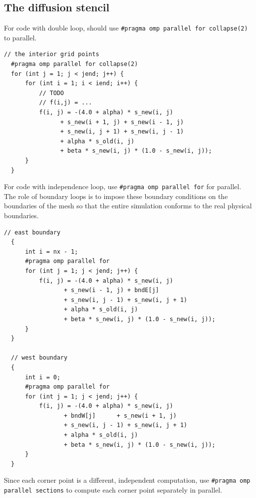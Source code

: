 \documentclass[unicode,11pt,a4paper,oneside,numbers=endperiod,openany]{scrartcl}
\begin{document}
\subsection{The diffusion stencil}
For code with double loop, should use \texttt{\#pragma omp parallel for collapse(2)} to parallel.
\begin{lstlisting}[language=MyC++, style=mystyle, caption={Parallelized Interior Grid Points Calculation with Collapse}]
  // the interior grid points
  #pragma omp parallel for collapse(2)
  for (int j = 1; j < jend; j++) {
      for (int i = 1; i < iend; i++) {
          // TODO
          // f(i,j) = ...
          f(i, j) = -(4.0 + alpha) * s_new(i, j)
                + s_new(i + 1, j) + s_new(i - 1, j)
                + s_new(i, j + 1) + s_new(i, j - 1)
                + alpha * s_old(i, j)
                + beta * s_new(i, j) * (1.0 - s_new(i, j));
      }
  }
\end{lstlisting}
For code with independence loop, use \texttt{\#pragma omp parallel for} for parallel. The role of boundary loops is to impose these boundary conditions on the boundaries of the mesh so that the entire simulation conforms to the real physical boundaries.
\begin{lstlisting}[language=MyC++, style=mystyle, caption={Parallelized Boundary Calculation for East and West Boundaries}]
  // east boundary
  {
      int i = nx - 1;
      #pragma omp parallel for
      for (int j = 1; j < jend; j++) {
          f(i, j) = -(4.0 + alpha) * s_new(i, j)
                 + s_new(i - 1, j) + bndE[j]
                 + s_new(i, j - 1) + s_new(i, j + 1)
                 + alpha * s_old(i, j)
                 + beta * s_new(i, j) * (1.0 - s_new(i, j));
      }
  }

  // west boundary
  {
      int i = 0;
      #pragma omp parallel for
      for (int j = 1; j < jend; j++) {
          f(i, j) = -(4.0 + alpha) * s_new(i, j)
                 + bndW[j]      + s_new(i + 1, j)
                 + s_new(i, j - 1) + s_new(i, j + 1)
                 + alpha * s_old(i, j)
                 + beta * s_new(i, j) * (1.0 - s_new(i, j));
      }
  }
\end{lstlisting}
Since each corner point is a different, independent computation, use \texttt{\#pragma omp parallel sections} to compute each corner point separately in parallel.
\end{document}
